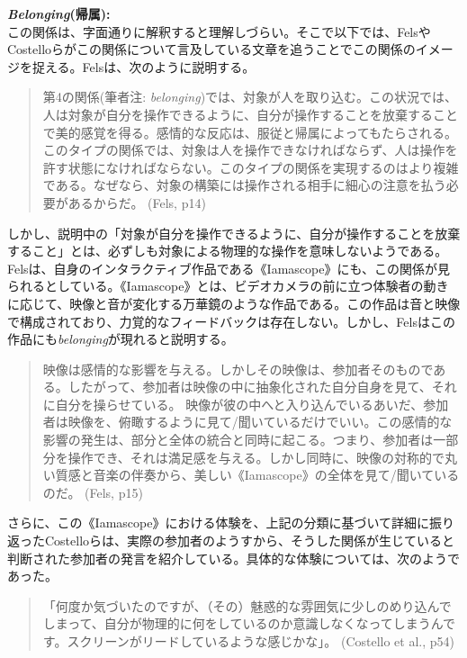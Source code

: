 \textbf{\textit{Belonging}(帰属):}\\
この関係は、字面通りに解釈すると理解しづらい。そこで以下では、FelsやCostelloらがこの関係について言及している文章を追うことでこの関係のイメージを捉える。Felsは、次のように説明する。

\begin{quote}
  第4の関係(筆者注: \textit{belonging})では、対象が人を取り込む。この状況では、人は対象が自分を操作できるように、自分が操作することを放棄することで美的感覚を得る。感情的な反応は、服従と帰属によってもたらされる。このタイプの関係では、対象は人を操作できなければならず、人は操作を許す状態になければならない。このタイプの関係を実現するのはより複雑である。なぜなら、対象の構築には操作される相手に細心の注意を払う必要があるからだ。  (Fels\cite{Fels}, p14)
\end{quote}

しかし、説明中の「対象が自分を操作できるように、自分が操作することを放棄すること」とは、必ずしも対象による物理的な操作を意味しないようである。Felsは、自身のインタラクティブ作品である《Iamascope》にも、この関係が見られるとしている。《Iamascope》とは、ビデオカメラの前に立つ体験者の動きに応じて、映像と音が変化する万華鏡のような作品である。この作品は音と映像で構成されており、力覚的なフィードバックは存在しない。しかし、Felsはこの作品にも\textit{belonging}が現れると説明する。

\begin{quote}
  映像は感情的な影響を与える。しかしその映像は、参加者そのものである。したがって、参加者は映像の中に抽象化された自分自身を見て、それに自分を操らせている。
  映像が彼の中へと入り込んでいるあいだ、参加者は映像を、俯瞰するように見て/聞いているだけでいい。この感情的な影響の発生は、部分と全体の統合と同時に起こる。つまり、参加者は一部分を操作でき、それは満足感を与える。しかし同時に、映像の対称的で丸い質感と音楽の伴奏から、美しい《Iamascope》の全体を見て/聞いているのだ。  (Fels\cite{Fels}, p15)
\end{quote}

さらに、この《Iamascope》における体験を、上記の分類に基づいて詳細に振り返ったCostelloらは、実際の参加者のようすから、そうした関係が生じていると判断された参加者の発言を紹介している。具体的な体験については、次のようであった。

\begin{quote}
  「何度か気づいたのですが、（その）魅惑的な雰囲気に少しのめり込んでしまって、自分が物理的に何をしているのか意識しなくなってしまうんです。スクリーンがリードしているような感じかな」。 (Costello et al.\cite{Costello2005}, p54) 
\end{quote}

